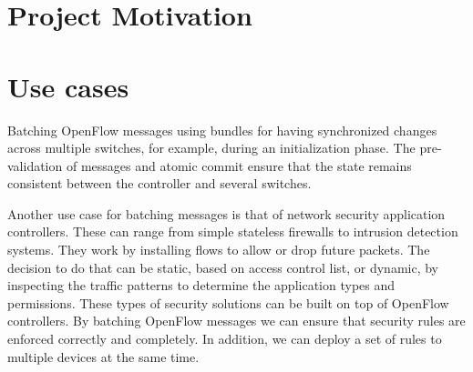 \section{Project Motivation}

\section{Use cases}

Batching OpenFlow messages using bundles for having synchronized changes across multiple switches,
for example, during an initialization phase. The pre-validation of messages and atomic commit ensure
that the state remains consistent between the controller and several switches.

Another use case for batching messages is that of network security application controllers. These can range
from simple stateless firewalls to intrusion detection systems\cite{sdn}. They work by installing flows to
allow or drop future packets. The decision to do that can be static, based on access control list, or dynamic,
by inspecting the traffic patterns to determine the application types and permissions.
These types of security solutions can be built on top of OpenFlow controllers. By batching OpenFlow
messages we can ensure that security rules are enforced correctly and completely. In addition, we can
deploy a set of rules to multiple devices at the same time.